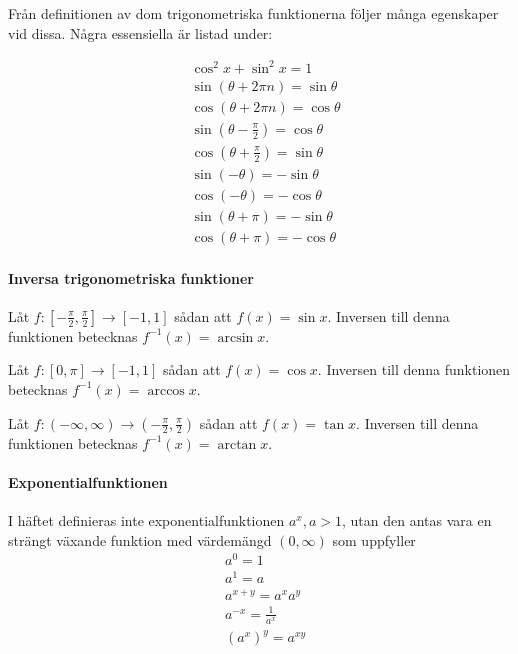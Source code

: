 Från definitionen av dom trigonometriska funktionerna följer många egenskaper vid dissa. Några essensiella är listad under:

\begin{align*}
	&\cos^2x + \sin^2x = 1\\
	&\sin\left(\theta + 2\pi n\right) = \sin\theta\\
	&\cos\left(\theta + 2\pi n\right) = \cos\theta\\
	&\sin\left(\theta - \frac{\pi}{2}\right) = \cos\theta\\
	&\cos\left(\theta + \frac{\pi}{2}\right) = \sin\theta\\
	&\sin\left(-\theta\right) = -\sin\theta\\
	&\cos\left(-\theta\right) = -\cos\theta\\
	&\sin\left(\theta+\pi\right) = -\sin\theta\\
	&\cos\left(\theta+\pi\right) = -\cos\theta
\end{align*}

\paragraph{Inversa trigonometriska funktioner}

Låt $f:\left[-\frac{\pi}{2},\frac{\pi}{2}\right]\to [-1,1]$ sådan att $f(x)=\sin x$. Inversen till denna funktionen betecknas $f^{-1}(x)=\arcsin x$.

Låt $f:[0,\pi]\to [-1,1]$ sådan att $f(x)=\cos x$. Inversen till denna funktionen betecknas $f^{-1}(x)=\arccos x$.

Låt $f:(-\infty,\infty)\to \left(-\frac{\pi}{2},\frac{\pi}{2}\right)$ sådan att $f(x)=\tan x$. Inversen till denna funktionen betecknas $f^{-1}(x)=\arctan x$.

\paragraph{Exponentialfunktionen}

I häftet definieras inte exponentialfunktionen $a^x, a>1$, utan den antas vara en strängt växande funktion med värdemängd $(0,\infty)$ som uppfyller
\begin{align*}
	&a^0 = 1\\
	&a^1 = a\\
	&a^{x + y} = a^x a^y\\
	&a^{-x} = \frac{1}{a^x}\\
	&\left(a^x\right)^y = a^{xy}
\end{align*}

